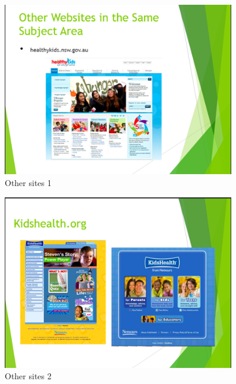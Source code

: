 \documentclass[letterpaper,12pt]{article}
\begin{document}
\begin{figure}[ht!]
  \centering
  \includegraphics[width=0.9\textwidth]{assets/jpg/othersite_1}
  \caption{Other sites 1}
  \label{fig:othersites}
\end{figure}
\FloatBarrier

\begin{figure}[ht!]
  \centering
  \includegraphics[width=0.9\textwidth]{assets/jpg/othersite_2}
  \caption{Other sites 2}
  \label{fig:othersites-2}
\end{figure}
\FloatBarrier
\end{document}
